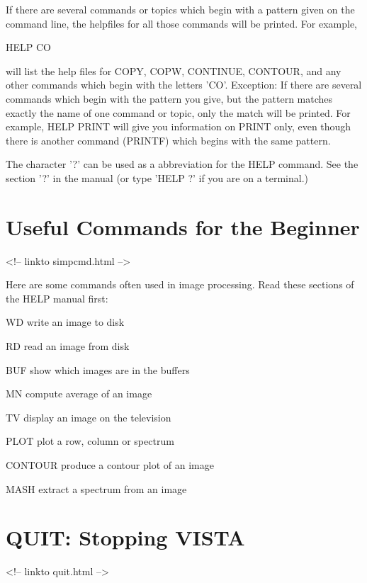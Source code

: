If there are several commands or topics which begin with a pattern given on
the command line, the helpfiles for all those commands will be printed.
For example,
\begin{hanging}
   \item{HELP CO}
\end{hanging}
will list the help files for COPY, COPW, CONTINUE, CONTOUR, and any other
commands which begin with the letters 'CO'.  Exception: If there are
several commands which begin with the pattern you give, but the pattern
matches exactly the name of one command or topic, only the match will be
printed.  For example, HELP PRINT will give you information on PRINT only,
even though there is another command (PRINTF) which begins with the same
pattern.

The character '?' can be used as a abbreviation for the HELP command.  See
the section '?' in the manual (or type 'HELP ?' if you are on a terminal.)

\section{Useful Commands for the Beginner}
\begin{rawhtml}
<!-- linkto simpcmd.html -->
\end{rawhtml}


Here are some commands often used in image processing.  Read these sections
of the HELP manual first:

\begin{example}
   \item[WD\hfill]{write an image to disk}
   \item[RD\hfill]{read an image from disk}
   \item[BUF\hfill]{show which images are in the buffers}
   \item[MN\hfill]{compute average of an image}
   \item[TV\hfill]{display an image on the television}
   \item[PLOT\hfill]{plot a row, column or spectrum}
   \item[CONTOUR\hfill]{produce a contour plot of an image}
   \item[MASH\hfill]{extract a spectrum from an image}
\end{example}

\section{QUIT: Stopping VISTA}
\begin{rawhtml}
<!-- linkto quit.html -->
\end{rawhtml}


